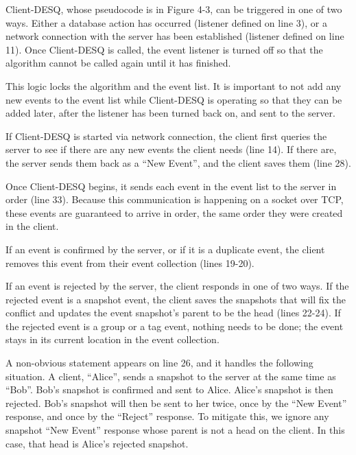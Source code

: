 Client-DESQ, whose pseudocode is in Figure 4-3, can be triggered in one of two ways. Either a database action has occurred (listener defined on line 3), or a network connection with the server has been established (listener defined on line 11). Once Client-DESQ is called, the event listener is turned off so that the algorithm cannot be called again until it has finished. 

This logic locks the algorithm and the event list. It is important to not add any new events to the event list while Client-DESQ is operating so that they can be added later, after the listener has been turned back on, and sent to the server.

If Client-DESQ is started via network connection, the client first queries the server to see if there are any new events the client needs (line 14). If there are, the server sends them back as a ``New Event'', and the client saves them (line 28).

Once Client-DESQ begins, it sends each event in the event list to the server in order (line 33). Because this communication is happening on a socket over TCP, these events are guaranteed to arrive in order, the same order they were created in the client.

If an event is confirmed by the server, or if it is a duplicate event, the client removes this event from their event collection (lines 19-20). 

If an event is rejected by the server, the client responds in one of two ways. If the rejected event is a snapshot event, the client saves the snapshots that will fix the conflict and updates the event snapshot's parent to be the head (lines 22-24). If the rejected event is a group or a tag event, nothing needs to be done; the event stays in its current location in the event collection.

A non-obvious statement appears on line 26, and it handles the following situation. A client, ``Alice'', sends a snapshot to the server at the same time as ``Bob''. Bob's snapshot is confirmed and sent to Alice. Alice's snapshot is then rejected. Bob's snapshot will then be sent to her twice, once by the ``New Event'' response, and once by the ``Reject'' response. To mitigate this, we ignore any snapshot ``New Event'' response whose parent is not a head on the client. In this case, that head is Alice's rejected snapshot. 

